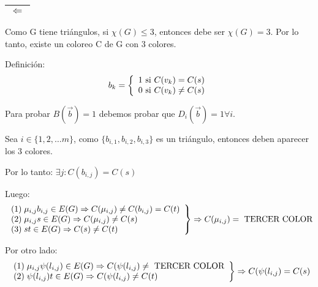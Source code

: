 \documentclass[12pt,a4paper]{report}
\newcounter{neq}
\begin{document}
			\vspace{5mm}
			\begin{tabular}{|c|} \hline $\Leftarrow$ \\\hline \end{tabular}
				\par Como G tiene triángulos, si $\chi (G) \leq 3$, entonces debe ser $\chi (G) = 3$. Por lo tanto, existe un coloreo C de G con 3 colores.
				\vspace{3mm}
				\par Definición:
				\begin{equation*}
					b_{k} =
		  		\left \lbrace
		  		\begin{array}{l}
		    		1 \textup{ si } C(v_{k}) = C(s) \\
		    		0 \textup{ si } C(v_{k}) \neq C(s)
		  		\end{array}
		  		\right.
				\end{equation*}
				\par Para probar $B(\overrightarrow{b}) = 1$ debemos probar que $D_{i}(\overrightarrow{b}) = 1 \forall i$.
				\par Sea $i \in \lbrace	1, 2, \dotsc m \rbrace$, como $ \lbrace b_{i, 1}, b_{i, 2}, b_{i, 3} \rbrace$ es un triángulo, entonces deben aparecer los 3 colores.
				\vspace{3mm}
				\par 	Por lo tanto: $\exists j : C(b_{i, j}) = C(s)$
				\vspace{3mm}
				\par Luego:
				\begin{equation*}
		  		\left.
		  		\begin{array}{l}
		    		(1) \; \mu_{i, j} b_{i, j} \in E(G) \Rightarrow C(\mu_{i, j}) \neq C(b_{i, j}) = C(t) \\
		    		(2) \; \mu_{i, j} s \in E(G) \Rightarrow C(\mu_{i, j}) \neq C(s) \\
		    		(3) \; s t \in E(G) \Rightarrow C(s) \neq C(t)
		  		\end{array}
		 			\right\rbrace
		 			\Rightarrow C(\mu_{i, j}) = \textup{ TERCER COLOR}
				\end{equation*}

				\par Por otro lado:
				\begin{equation*}
		  		\left.
		  		\begin{array}{l}
		    	 	(1) \; \mu_{i, j} \psi(l_{i, j}) \in E(G) \Rightarrow C(\psi(l_{i, j}) \neq \textup{ TERCER COLOR} \\
		    	 	(2) \; \psi(l_{i, j}) t \in E(G) \Rightarrow C(\psi(l_{i, j}) \neq C(t)
		  		\end{array}
		 		 	\right\rbrace
		 			\Rightarrow C(\psi(l_{i, j}) = C(s)
				\end{equation*}
\end{document}
